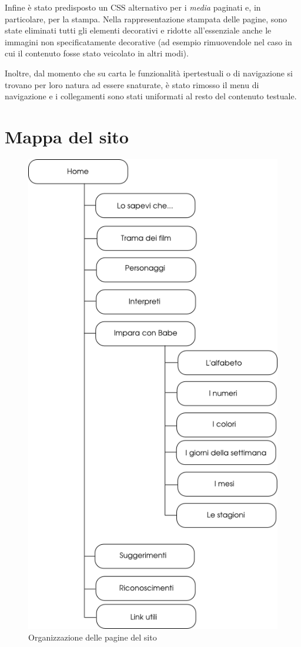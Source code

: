 \documentclass[10pt,a4paper,onecolumn]{article}
\newcommand{\inglese}[1]{\foreignlanguage{english}{\itshape{}#1}}
\begin{document}
Infine è stato predisposto un CSS alternativo per i \inglese{media} paginati e, in particolare, per la stampa. Nella rappresentazione stampata delle pagine, sono state eliminati tutti gli elementi decorativi e ridotte all'essenziale anche le immagini non specificatamente decorative (ad esempio rimuovendole nel caso in cui il contenuto fosse stato veicolato in altri modi).

Inoltre, dal momento che su carta le funzionalità ipertestuali o di navigazione si trovano per loro natura ad essere snaturate, è stato rimosso il menu di navigazione e i collegamenti sono stati uniformati al resto del contenuto testuale.

\section{Mappa del sito}
\begin{figure}[tb]
\centering
\includegraphics[width=.8\textwidth]{mappasito.png}
\caption{Organizzazione delle pagine del sito}
\end{figure}
\end{document}
